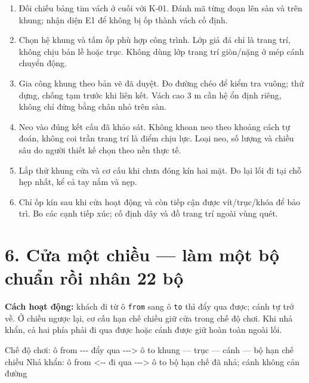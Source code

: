 \documentclass[
  11pt,
  a4paper,
]{article}
\newenvironment{Shaded}{}{}
\newcommand{\NormalTok}[1]{#1}
\providecommand{\tightlist}{%
  \setlength{\itemsep}{0pt}\setlength{\parskip}{0pt}}
\begin{document}
\begin{enumerate}
\def\labelenumi{\arabic{enumi}.}
\tightlist
\item
  Đối chiếu bảng tim vách ở cuối với K-01. Đánh mã từng đoạn lên sàn và
  trên khung; nhận diện E1 để không bị ốp thành vách cố định.
\item
  Chọn hệ khung và tấm ốp phù hợp công trình. Lớp giả đá chỉ là trang
  trí, không chịu bản lề hoặc trục. Không dùng lớp trang trí giòn/nặng ở
  mép cánh chuyển động.
\item
  Gia công khung theo bản vẽ đã duyệt. Đo đường chéo để kiểm tra vuông;
  thử dựng, chống tạm trước khi liên kết. Vách cao 3 m cần hệ ổn định
  riêng, không chỉ đứng bằng chân nhỏ trên sàn.
\item
  Neo vào đúng kết cấu đã khảo sát. Không khoan neo theo khoảng cách tự
  đoán, không coi trần trang trí là điểm chịu lực. Loại neo, số lượng và
  chiều sâu do người thiết kế chọn theo nền thực tế.
\item
  Lắp thử khung cửa và cơ cấu khi chưa đóng kín hai mặt. Đo lại lối đi
  tại chỗ hẹp nhất, kể cả tay nắm và nẹp.
\item
  Chỉ ốp kín sau khi cửa hoạt động và còn tiếp cận được vít/trục/khóa để
  bảo trì. Bo các cạnh tiếp xúc; cố định dây và đồ trang trí ngoài vùng
  quét.
\end{enumerate}

\section{6. Cửa một chiều --- làm một bộ chuẩn rồi nhân 22
bộ}\label{cux1eeda-mux1ed9t-chiux1ec1u-luxe0m-mux1ed9t-bux1ed9-chuux1ea9n-rux1ed3i-nhuxe2n-22-bux1ed9}

\textbf{Cách hoạt động:} khách đi từ ô \texttt{from} sang ô \texttt{to}
thì đẩy qua được; cánh tự trở về. Ở chiều ngược lại, cơ cấu hạn chế
chiều giữ cửa trong chế độ chơi. Khi nhả khẩn, cả hai phía phải đi qua
được hoặc cánh được giữ hoàn toàn ngoài lối.

\begin{Shaded}
\begin{Highlighting}[]
\NormalTok{Chế độ chơi:       ô from  {-}{-}{-} đẩy qua {-}{-}{-}\textgreater{}  ô to}
\NormalTok{                   khung — trục — cánh — bộ hạn chế chiều}
\NormalTok{Nhả khẩn:          ô from  \textless{}{-}{-} đi qua {-}{-}{-}\textgreater{}  ô to}
\NormalTok{                   bộ hạn chế đã nhả; cánh không cản đường}
\end{Highlighting}
\end{Shaded}
\end{document}
